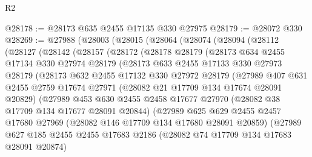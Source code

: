 \begin{lexlean}{R2}
\begin{coremodule}
@28178 := @28173 @635 @2455 @17135 @330 @27975
@28179 := @28072 @330
@28269 := @27988
    (@28003
      (@28015
        (@28064
          (@28074
            (@28094
              (@28112
                (@28127
                  (@28142
                    (@28157
                      (@28172
                        (@28178
                          @28179
                          (@28173
                            @634
                            @2455
                            @17134
                            @330
                            @27974
                            @28179
                            (@28173
                              @633
                              @2455
                              @17133
                              @330
                              @27973
                              @28179
                              (@28173
                                @632
                                @2455
                                @17132
                                @330
                                @27972
                                @28179
                                (@27989
                                  @407
                                  @631
                                  @2455
                                  @2759
                                  @17674
                                  @27971
                                  (@28082 @21 @17709 @134 @17674 @28091 @20829)
                                  (@27989
                                    @453
                                    @630
                                    @2455
                                    @2458
                                    @17677
                                    @27970
                                    (@28082 @38 @17709 @134 @17677 @28091 @20844)
                                    (@27989
                                      @625
                                      @629
                                      @2455
                                      @2457
                                      @17680
                                      @27969
                                      (@28082 @146 @17709 @134 @17680 @28091 @20859)
                                      (@27989
                                        @627
                                        @185
                                        @2455
                                        @2455
                                        @17683
                                        @2186
                                        (@28082 @74 @17709 @134 @17683 @28091 @20874)

\end{coremodule}
\end{lexlean}

